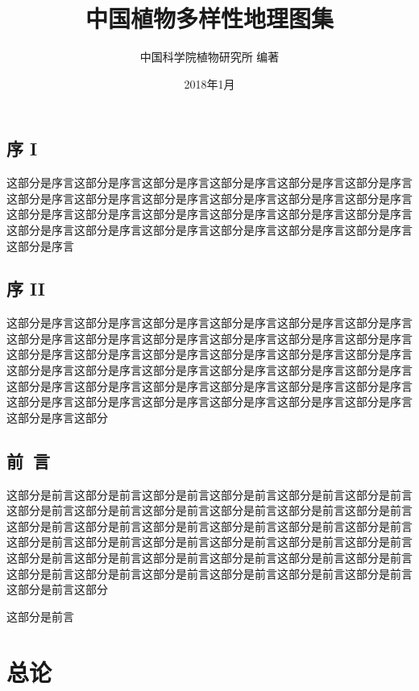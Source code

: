 \documentclass[utf8]{book}
\begin{document}
	\title{\heiti 中国植物多样性地理图集}
	\author{\fangsong 中国科学院植物研究所 编著}
	\date{2018年1月}
	
	\frontmatter
	\maketitle
	
	\chapter{序 I}
	
	这部分是序言这部分是序言这部分是序言这部分是序言这部分是序言这部分是序言这部分是序言这部分是序言这部分是序言这部分是序言这部分是序言这部分是序言这部分是序言这部分是序言这部分是序言这部分是序言这部分是序言这部分是序言这部分是序言这部分是序言这部分是序言这部分是序言这部分是序言这部分是序言这部分是序言
	
	\chapter{序 II}
	
	这部分是序言这部分是序言这部分是序言这部分是序言这部分是序言这部分是序言这部分是序言这部分是序言这部分是序言这部分是序言这部分是序言这部分是序言这部分是序言这部分是序言这部分是序言这部分是序言这部分是序言这部分是序言这部分是序言这部分是序言这部分是序言这部分是序言这部分是序言这部分是序言这部分是序言这部分是序言这部分是序言这部分是序言这部分是序言这部分是序言这部分是序言这部分是序言这部分是序言这部分是序言这部分是序言这部分是序言这部分是序言这部分
	
	\chapter{前~言}
	
	这部分是前言这部分是前言这部分是前言这部分是前言这部分是前言这部分是前言这部分是前言这部分是前言这部分是前言这部分是前言这部分是前言这部分是前言这部分是前言这部分是前言这部分是前言这部分是前言这部分是前言这部分是前言这部分是前言这部分是前言这部分是前言这部分是前言这部分是前言这部分是前言这部分是前言这部分是前言这部分是前言这部分是前言这部分是前言这部分是前言这部分是前言这部分是前言这部分是前言这部分是前言这部分是前言这部分是前言这部分是前言这部分
	
	这部分是前言
	
	\renewcommand\contentsname{目~录}
	\tableofcontents
	
	\mainmatter
	
	\part{总论}
	
\end{document}
